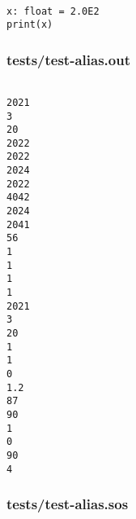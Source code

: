 \documentclass[main.tex]{subfiles}
\begin{document}
\begin{lstlisting}

x: float = 2.0E2
print(x)
\end{lstlisting}

\subsubsection{tests/test-alias.out}

\begin{lstlisting}

2021
3
20
2022
2022
2024
2022
4042
2024
2041
56
1
1
1
1
2021
3
20
1
1
0
1.2
87
90
1
0
90
4
\end{lstlisting}

\subsubsection{tests/test-alias.sos}
\end{document}
